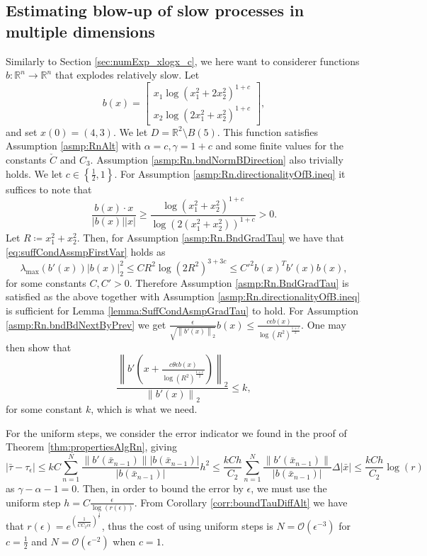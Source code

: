 \documentclass[a4paper, oneside, reqno]{amsart}
\newcommand{\abs}[1]{\left\lvert#1\right\rvert}
\newcommand{\norm}[1]{\left\|#1\right\|}
\newcommand{\R}{\mathbb{R}}
\theoremstyle{remark}
\begin{document}
\subsection{Estimating blow-up of slow processes in multiple dimensions}
\label{sec:numExp_slowGrowthMultidim}
Similarly to Section \ref{sec:numExp_xlogx_c}, we here want to considerer functions \(b:\R^n\to\R^n\) that explodes relatively slow. Let 
\[b(x) = 
    \begin{bmatrix}
        x_1\log(x_1^2 + 2x_2^2)^{1+c} \\
        x_2\log(2x_1^2 + x_2^2)^{1+c} 
    \end{bmatrix},\]
and set \(x(0) = (4, 3)\). We let \(D = \R^2\setminus B(5)\). 
This function satisfies Assumption \ref{asmp:RnAlt} with \(\alpha  = c, \gamma = 1 + c\) and some finite values for the constants \(\check{C}\) and \(C_3\). 
Assumption \ref{asmp:Rn.bndNormBDirection} also trivially holds.  
We let \(c \in \left\{\frac{1}{2}, 1\right\}\). 
For Assumption \ref{asmp:Rn.directionalityOfB.ineq} it suffices to note that  
\[\frac{b(x)\cdot x}{\abs{b(x)}\abs{x}} \geq \frac{\log(x_1^2 + x_2^2)^{1+c}}{\log(2(x_1^2 + x_2^2))^{1+c}} > 0.\]
Let \(R \coloneqq x_1^2 + x_2^2\). Then, for Assumption \ref{asmp:Rn.BndGradTau} we have that \eqref{eq:suffCondAssmpFirstVar} holds as
\begin{equation*}
    \lambda_{\max}(b'(x))\abs{b(x)}_2^2 \leq CR^2\log(2R^2)^{3+3c} \leq C'^2 b(x)^Tb'(x)b(x),
\end{equation*}
for some constants \(C, C'>0\).
Therefore Assumption \ref{asmp:Rn.BndGradTau} is satisfied as the above together with Assumption \ref{asmp:Rn.directionalityOfB.ineq} is sufficient for Lemma \ref{lemma:SuffCondAsmpGradTau} to hold.
For Assumption \ref{asmp:Rn.bndBdNextByPrev} we get \(\frac{\epsilon}{\sqrt{\norm{b'(x)}_2}}b(x) \leq \frac{c\epsilon b(x)}{\log(R^2)^{\frac{1+c}{2}}}.\)
One may then show that
\[\frac{\norm{b'\left(x + \frac{c\theta\epsilon b(x)}{\log(R^2)^{\frac{1+c}{2}}}\right)}_2}{\norm{b'(x)}_2} \leq k,\]
for some constant \(k\), which is what we need. 

For the uniform steps, we consider the error indicator we found in the proof of Theorem \ref{thm:propertiesAlgRn}, giving
\[\abs{\bar\tau - \tau_\epsilon} \leq kC\sum_{n=1}^{N}\frac{\norm{b'(\bar x_{n-1})}\abs{b(\bar x_{n-1})}}{\abs{b(\bar x_{n-1})}}h^2 \leq \frac{kCh}{C_2}\sum_{n=1}^{N}\frac{\norm{b'(\bar x_{n-1})}}{\abs{b(\bar x_{n-1})}}\Delta\abs{\bar x} \leq \frac{kCh}{C_2}\log(r)\]
as \(\gamma - \alpha - 1 = 0\). Then, in order to bound the error by \(\epsilon\), we must use the uniform step \(h = C\frac{\epsilon}{\log(r(\epsilon))}\). From Corollary \ref{corr:boundTauDiffAlt} we have that \(r(\epsilon) = e^{\left(\frac{1}{\check{CC_2c\epsilon}}\right)^{\frac{1}{c}}}\), thus the cost of using uniform steps is \(N = \mathcal{O}\left(\epsilon^{-3}\right)\) for \(c = \frac{1}{2}\) and \(N = \mathcal{O}(\epsilon^{-2})\) when \(c = 1\).
\end{document}
